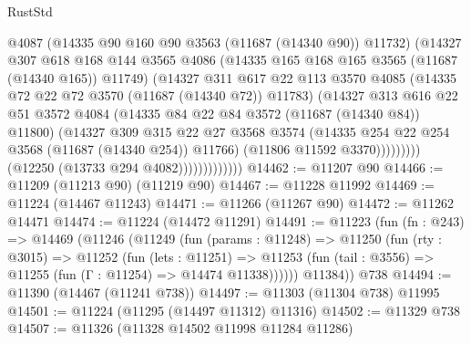 \begin{lexlean}{RustStd}
\begin{coremodule}
                                  @4087
                                  (@14335 @90 @160 @90 @3563 (@11687 (@14340 @90)) @11732)
                                  (@14327
                                    @307
                                    @618
                                    @168
                                    @144
                                    @3565
                                    @4086
                                    (@14335 @165 @168 @165 @3565 (@11687 (@14340 @165)) @11749)
                                    (@14327
                                      @311
                                      @617
                                      @22
                                      @113
                                      @3570
                                      @4085
                                      (@14335 @72 @22 @72 @3570 (@11687 (@14340 @72)) @11783)
                                      (@14327
                                        @313
                                        @616
                                        @22
                                        @51
                                        @3572
                                        @4084
                                        (@14335 @84 @22 @84 @3572 (@11687 (@14340 @84)) @11800)
                                        (@14327
                                          @309
                                          @315
                                          @22
                                          @27
                                          @3568
                                          @3574
                                          (@14335 @254 @22 @254 @3568 (@11687 (@14340 @254)) @11766)
                                          (@11806 @11592 @3370)))))))))
                          (@12250 (@13733 @294 @4082)))))))))))))
@14462 := @11207 @90
@14466 := @11209 (@11213 @90) (@11219 @90)
@14467 := @11228 @11992
@14469 := @11224 (@14467 @11243)
@14471 := @11266 (@11267 @90)
@14472 := @11262 @14471
@14474 := @11224 (@14472 @11291)
@14491 := @11223
    (fun (fn : @243) =>
    @14469
      (@11246
        (@11249
          (fun (params : @11248) =>
          @11250
            (fun (rty : @3015) =>
            @11252
              (fun (lets : @11251) =>
              @11253 (fun (tail : @3556) => @11255 (fun (Γ : @11254) => @14474 @11338))))))
        @11384))
    @738
@14494 := @11390 (@14467 (@11241 @738))
@14497 := @11303 (@11304 @738) @11995
@14501 := @11224 (@11295 (@14497 @11312) @11316)
@14502 := @11329 @738
@14507 := @11326 (@11328 @14502 @11998 @11284 @11286)

\end{coremodule}
\end{lexlean}
